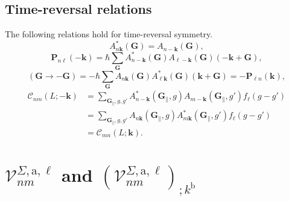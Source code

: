 \subsection{Time-reversal relations}
The following relations hold for time-reversal symmetry.
\begin{equation*}
A_{n\mathbf{k}}^{*}(\mathbf{G}) = A_{n-\mathbf{k}}(\mathbf{G}),
\end{equation*}
\begin{equation*}
\mathbf{P}_{n\ell }(-\mathbf{k}) 
=   \hbar\sum_{\mathbf{G}}
    A_{n-\mathbf{k}}^{*}(\mathbf{G})
    A_{\ell -\mathbf{k}}(\mathbf{G})(-\mathbf{k}+\mathbf{G}),
\end{equation*}
\begin{equation*}
(\mathbf{G}\rightarrow-\mathbf{G})
=   -\hbar\sum_{\mathbf{G}}
    A_{n\mathbf{k}}(\mathbf{G})
    A_{\ell\mathbf{k}}^{*}(\mathbf{G})(\mathbf{k}+\mathbf{G})
=   -\mathbf{P}_{\ell n}(\mathbf{k}),
\end{equation*}
\begin{align*}
\mathcal{C}_{nm} (L;-\mathbf{k}) 
&=  \sum_{\mathbf{G}_{\parallel},g,g'}
    A_{n-\mathbf{k}}^{*}(\mathbf{G}_{\parallel},g)
    A_{m-\mathbf{k}}(\mathbf{G}_{\parallel},g')
    f_{\ell}(g-g') \\
&=  \sum_{\mathbf{G}_{\parallel},g,g'}
    A_{n\mathbf{k}} (\mathbf{G}_{\parallel},g)
    A_{m\mathbf{k}}^{*} (\mathbf{G}_{\parallel},g')
    f_{\ell}(g-g') \\
&=  \mathcal{C}_{mn}(L;\mathbf{k}).
\end{align*}



\section{
\texorpdfstring{$\mathcal{V}^{\Sigma,\mathrm{a},\ell}_{nm}$}{Vnm} and 
\texorpdfstring{
$\left(\mathcal{V}^{\Sigma,\mathrm{a},\ell}_{nm}\right)_{;k^\mathrm{b}}$}
{(Vnm);kb}}
\label{app:calvs}


